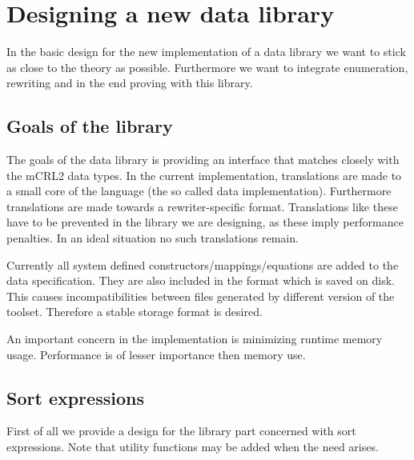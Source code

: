 \documentclass[a4paper,11pt]{article}
\newcommand{\comment}[1]{\begin{quotation} {\sf *** #1 ***} \end{quotation}}
\begin{document}
\section{Designing a new data library}
In the basic design for the new implementation of a data library we want to stick as close to the theory as possible. Furthermore we want to integrate enumeration, rewriting and in the end proving with this library.

\subsection{Goals of the library}
The goals of the data library is providing an interface that matches closely with the mCRL2 data types. In the current implementation, translations are made to a small core of the language (the so called data implementation). Furthermore translations are made towards a rewriter-specific format. Translations like these have to be prevented in the library we are designing, as these imply performance penalties. In an ideal situation no such translations remain.

Currently all system defined constructors/mappings/equations are added to the data specification. They are also included in the format which is saved on disk. This causes incompatibilities between files generated by different version of the toolset. Therefore a stable storage format is desired.

An important concern in the implementation is minimizing runtime memory usage. Performance is of lesser importance then memory use.

\subsection{Sort expressions}
% 
First of all we provide a design for the library part concerned with sort expressions. Note that utility functions may be added when the need arises.
\end{document}
